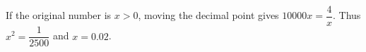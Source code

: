 If the original number is $x>0$, moving the decimal point gives $10000x=\dfrac{4}{x}$. Thus $x^2=\dfrac{1}{2500}$ and $\boxed{x=0.02}$.
